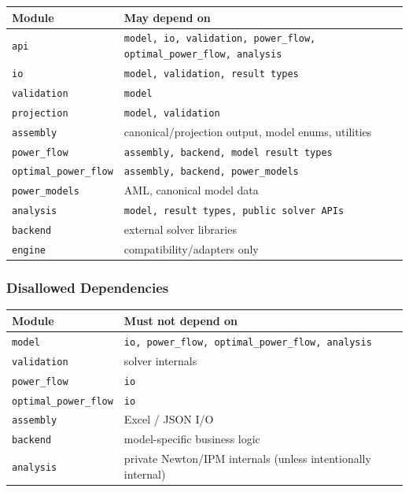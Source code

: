 \begin{center}
\begin{tabular}{ll}
\hline\hline
\textbf{Module} & \textbf{May depend on} \\
\hline
\texttt{api} & \texttt{model, io, validation, power\_flow, optimal\_power\_flow, analysis} \\
\texttt{io} & \texttt{model, validation, result types} \\
\texttt{validation} & \texttt{model} \\
\texttt{projection} & \texttt{model, validation} \\
\texttt{assembly} & canonical/projection output, model enums, utilities \\
\texttt{power\_flow} & \texttt{assembly, backend, model result types} \\
\texttt{optimal\_power\_flow} & \texttt{assembly, backend, power\_models} \\
\texttt{power\_models} & AML, canonical model data \\
\texttt{analysis} & \texttt{model, result types, public solver APIs} \\
\texttt{backend} & external solver libraries \\
\texttt{engine} & compatibility/adapters only \\
\hline\hline
\end{tabular}
\end{center}

\subsubsection{Disallowed Dependencies}

\begin{center}
\begin{tabular}{ll}
\hline\hline
\textbf{Module} & \textbf{Must not depend on} \\
\hline
\texttt{model} & \texttt{io, power\_flow, optimal\_power\_flow, analysis} \\
\texttt{validation} & solver internals \\
\texttt{power\_flow} & \texttt{io} \\
\texttt{optimal\_power\_flow} & \texttt{io} \\
\texttt{assembly} & Excel / JSON I/O \\
\texttt{backend} & model-specific business logic \\
\texttt{analysis} & private Newton/IPM internals (unless intentionally internal) \\
\hline\hline
\end{tabular}
\end{center}

